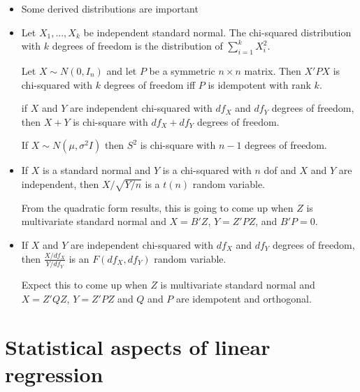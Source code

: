 \begin{itemize}[leftmargin=0pt]
\item Some derived distributions are important

\item %
  \begin{defn}
    Let $X_1,...,X_k$ be independent standard normal.  The
    chi-squared distribution with $k$ degrees of freedom is the
    distribution of $\sum_{i=1}^k X^2_i$.
  \end{defn}

  \begin{thm}
    Let $X \sim N(0, I_n)$ and let $P$ be a symmetric $n \times n$ matrix.
    Then $X'PX$ is chi-squared with $k$ degrees of freedom iff $P$ is
    idempotent with rank $k$.
  \end{thm}

  \begin{thm}
    if $X$ and $Y$ are independent chi-squared with $df_X$ and $df_Y$
    degrees of freedom, then $X + Y$ is chi-square with $df_X + df_Y$
    degrees of freedom.
  \end{thm}

  If $X \sim N(\mu, \sigma^2 I)$ then $S^2$ is chi-square with $n-1$ degrees of
  freedom.

\item %
  \begin{defn}
    If $X$ is a standard normal and $Y$ is a chi-squared with $n$ dof
    and $X$ and $Y$ are independent, then $X / \sqrt{Y/n}$ is a $t(n)$
    random variable.
  \end{defn}
  From the quadratic form results, this is going to come up when $Z$
  is multivariate standard normal and $X = B'Z$, $Y = Z'PZ$, and $B'P
  = 0$.

\item %
  \begin{defn}
    If $X$ and $Y$ are independent chi-squared with $df_X$ and $df_Y$
    degrees of freedom, then $\frac{X/df_X}{Y/df_Y}$ is an $F(df_X,
    df_Y)$ random variable.
  \end{defn}

  Expect this to come up when $Z$ is multivariate standard normal and
  $X = Z'QZ$, $Y = Z'PZ$ and $Q$ and $P$ are idempotent and orthogonal.

\end{itemize}

\section{Statistical aspects of linear regression}

